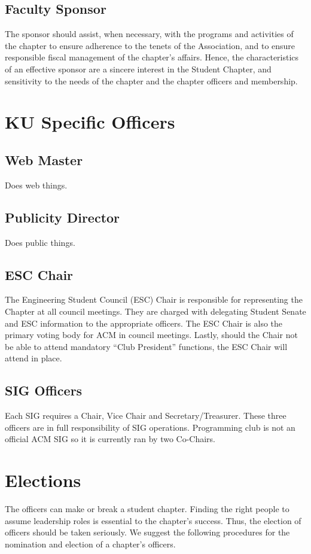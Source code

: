 \subsection*{Faculty Sponsor}
The sponsor should assist, when necessary, with the programs and activities of the chapter to ensure adherence to the tenets of the Association, and to ensure responsible fiscal management of the chapter's affairs. Hence, the characteristics of an effective sponsor are a sincere interest in the Student Chapter, and sensitivity to the needs of the chapter and the chapter officers and membership.
\section*{KU Specific Officers}
\subsection*{Web Master}
Does web things.
\subsection*{Publicity Director}
Does public things.
\subsection*{ESC Chair}
The Engineering Student Council (ESC) Chair is responsible for representing the Chapter at all council meetings. They are charged with delegating Student Senate and ESC information to the appropriate officers.  The ESC Chair is also the primary voting body for ACM in council meetings. Lastly, should the Chair not be able to attend mandatory “Club President” functions, the ESC Chair will attend in place.
\subsection*{SIG Officers}
Each SIG requires a Chair, Vice Chair and Secretary/Treasurer. These three officers are in full responsibility of SIG operations. Programming club is not an official ACM SIG so it is currently ran by two Co-Chairs.

\section{Elections}

The officers can make or break a student chapter. Finding the right people to assume leadership roles is essential to the chapter's success. Thus, the election of officers should be taken seriously. We suggest the following procedures for the nomination and election of a chapter's officers.
